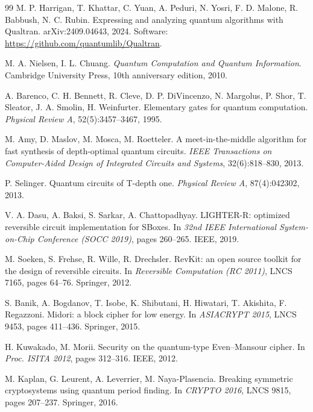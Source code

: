 \documentclass[runningheads,10pt]{llncs}
\begin{document}
\begin{thebibliography}{99}
 M. P. Harrigan, T. Khattar, C. Yuan, A. Peduri, N. Yosri, F. D. Malone, R. Babbush, N. C. Rubin. Expressing and analyzing quantum algorithms with Qualtran. arXiv:2409.04643, 2024. Software: \url{https://github.com/quantumlib/Qualtran}.

 M. A. Nielsen, I. L. Chuang. \emph{Quantum Computation and Quantum Information}. Cambridge University Press, 10th anniversary edition, 2010.

 A. Barenco, C. H. Bennett, R. Cleve, D. P. DiVincenzo, N. Margolus, P. Shor, T. Sleator, J. A. Smolin, H. Weinfurter. Elementary gates for quantum computation. \emph{Physical Review A}, 52(5):3457--3467, 1995.

 M. Amy, D. Maslov, M. Mosca, M. Roetteler. A meet-in-the-middle algorithm for fast synthesis of depth-optimal quantum circuits. \emph{IEEE Transactions on Computer-Aided Design of Integrated Circuits and Systems}, 32(6):818--830, 2013.

 P. Selinger. Quantum circuits of T-depth one. \emph{Physical Review A}, 87(4):042302, 2013.

 V. A. Dasu, A. Baksi, S. Sarkar, A. Chattopadhyay. LIGHTER-R: optimized reversible circuit implementation for SBoxes. In \emph{32nd IEEE International System-on-Chip Conference (SOCC 2019)}, pages 260--265. IEEE, 2019.

 M. Soeken, S. Frehse, R. Wille, R. Drechsler. RevKit: an open source toolkit for the design of reversible circuits. In \emph{Reversible Computation (RC 2011)}, LNCS 7165, pages 64--76. Springer, 2012.

 S. Banik, A. Bogdanov, T. Isobe, K. Shibutani, H. Hiwatari, T. Akishita, F. Regazzoni. Midori: a block cipher for low energy. In \emph{ASIACRYPT 2015}, LNCS 9453, pages 411--436. Springer, 2015.

 H. Kuwakado, M. Morii. Security on the quantum-type Even--Mansour cipher. In \emph{Proc. ISITA 2012}, pages 312--316. IEEE, 2012.

 M. Kaplan, G. Leurent, A. Leverrier, M. Naya-Plasencia. Breaking symmetric cryptosystems using quantum period finding. In \emph{CRYPTO 2016}, LNCS 9815, pages 207--237. Springer, 2016.

\end{thebibliography}
\end{document}
